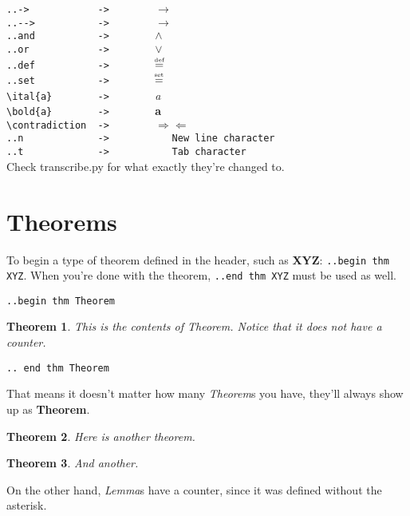 \documentclass[12pt]{article}
\newcommand{\pytexdef}{\mathrel{\stackrel{\makebox[0pt]{\mbox{\normalfont\tiny def}}}{=}}}
\newcommand{\pytexset}{\mathrel{\stackrel{\makebox[0pt]{\mbox{\normalfont\tiny set}}}{=}}}
\newtheorem*{Theorem}{Theorem}
\begin{document}
\begin{flushleft}
\verb|..->            ->        |$\to$\\
\verb|..-->           ->        |$\longrightarrow$\\
\verb|..and           ->        |$\wedge$\\
\verb|..or            ->        |$\vee$\\
\verb|..def           ->        |$\pytexdef$\\
\verb|..set           ->        |$\pytexset$\\
\bigskip
\verb|\ital{a}        ->        |\emph{a}\\
\verb|\bold{a}        ->        |\textbf{a}\\
\verb|\contradiction  ->        |$\Rightarrow\Leftarrow$ \\
\verb|..n             ->           New line character|\\
\verb|..t             ->           Tab character|\\

\bigskip
Check transcribe.py for what exactly they're changed to.

\newpage

\section*{Theorems}

\bigskip

To begin a type of theorem defined in the header, such as \textbf{XYZ}: \verb|..begin thm XYZ|. When you're done with the theorem, \verb|..end thm XYZ| must be used as well.

\medskip

\verb|..begin thm Theorem|
\begin{Theorem}
This is the contents of Theorem. Notice that it does not have a counter.
\end{Theorem}
\verb|.. end thm Theorem|

\medskip

That means it doesn't matter how many \emph{Theorem}s you have, they'll always show up as \textbf{Theorem}.

\begin{Theorem}
Here is another theorem.
\end{Theorem}

\begin{Theorem}
And another.
\end{Theorem}

On the other hand, \emph{Lemma}s have a counter, since it was defined without the asterisk.


\end{flushleft}
\end{document}
